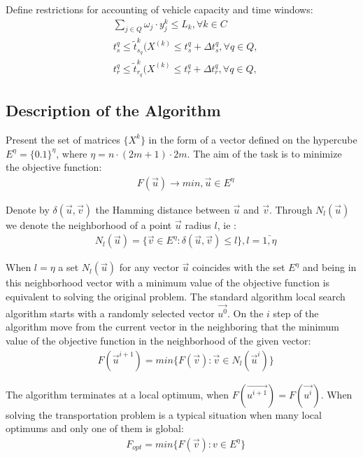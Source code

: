 \documentclass[]{TAACpaper}
\begin{document}
Define restrictions for accounting of vehicle capacity and time windows:
\begin{align} 
& \sum_{j\in{Q}} \omega_j \cdot y_{j}^{k} \leq L_k, \forall{k}\in{C}\\
& t_{s}^{q} \leq \tilde{t}^k_{s_q}(X^{(k)} \leq t_{s}^{q}+ \Delta{t_{s}^{q}}, \forall q \in Q, \label{tws_cond} \\
& t_{r}^{q} \leq \tilde{t}^k_{r_q}(X^{(k)} \leq t_{r}^{q}+ \Delta{t_{r}^{q}}, \forall q \in Q, \label{twr_cond}
\end{align}



\subsection{Description of the Algorithm}
Present the set of matrices $\{X^k\}$ in the form of a vector defined on the hypercube $E^\eta=\{0.1\}^\eta$, where $\eta=n\cdot(2m+1)\cdot 2m$. The aim of the task is to minimize the objective function:
\begin{align} 
& F(\vec{u})\to min,\vec{u}\in E^{\eta}
\end{align}	

Denote by $\delta(\vec{u},\vec{v})$ the Hamming distance between $\vec{u}$ and $\vec{v}$. Through $N_l(\vec{u})$ we denote the neighborhood of a point $\vec{u}$ radius $l$, ie \cite{vrp_shafeyev}:
\begin{align} 
& N_l(\vec{u})=\{\vec{v} \in E^{\eta}:\delta(\vec{u},\vec{v})\le l \}, l=\bar{1,\eta}
\end{align}	

When $l=\eta$ a set $ N_l(\vec{u})$ for any vector $\vec{u}$ coincides with the set $E^{\eta}$ and being in this neighborhood vector with a minimum value of the objective function is equivalent to solving the original problem. The standard algorithm local search algorithm starts with a randomly selected vector $\vec{u^0}$.
On the $i$ step of the algorithm move from the current vector in the neighboring that the minimum value of the objective function in the neighborhood of the given vector:
\begin{align} 
& F(\vec{u}^{i+1})=min\{F(\vec{v}):\vec{v} \in N_l(\vec{u}^i)\}
\end{align}	

The algorithm terminates at a local optimum, when $F(\vec{u^{i+1}})=F(\vec{u^i})$. When solving the transportation problem is a typical situation when many local optimums and only one of them is global:
\begin{align} 
& F_{opt}=min\{F(\vec{v}):v \in E^{\eta}\}
\end{align}	
\end{document}

